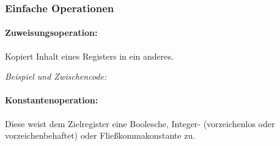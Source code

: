 \documentclass[twoside,a4paper,fleqn,12pt]{book}
\begin{document}
\newpage
\subsubsection{Einfache Operationen}

\newcommand\SeqOpSample[2]{
  \renewcommand{\baselinestretch}{1.0}\normalsize
  \emph{Beispiel und Zwischencode:}\\
  \makebox[\textwidth]{
    \centering
    \begin{minipage}{7cm}\end{minipage}
    \begin{minipage}{8cm}\end{minipage}
    \label{fig:ir_example_#1}
  }
  \renewcommand{\baselinestretch}{1.50}\normalsize
}
\newcommand\SeqOpSampleStacked[2]{
  \vspace*{1em}
  \emph{Beispiel und Zwischencode:}
  \vspace*{-1em}
  \renewcommand{\baselinestretch}{1.0}\normalsize
    \begin{center}
    \begin{minipage}{7cm}\end{minipage}
    \begin{minipage}{\textwidth}\end{minipage}
    \label{fig:ir_example_#1}
    \end{center}
    \vspace*{-1em}
  \renewcommand{\baselinestretch}{1.50}\normalsize
}

\paragraph{Zuweisungsoperation:} Kopiert Inhalt eines Registers in ein anderes.

\SeqOpSample{assign}{Zuweisungsoperation}


\paragraph{Konstantenoperation:} Diese weist dem Zielregister eine Boolesche, Integer- (vorzeichenlos oder vorzeichenbehaftet) oder
Fließkommakonstante zu.
\end{document}
